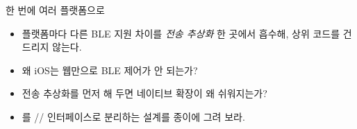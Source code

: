 \begin{teachbox}{한 번에 여러 플랫폼으로}
\begin{itemize}
  \item 플랫폼마다 다른 BLE 지원 차이를 \emph{전송 추상화} 한 곳에서 흡수해, 상위 코드를 건드리지 않는다.
\end{itemize}
\begin{itemize}
  \item 왜 iOS는 웹만으로 BLE 제어가 안 되는가?
  \item 전송 추상화를 먼저 해 두면 네이티브 확장이 왜 쉬워지는가?
\end{itemize}
\begin{itemize}
  \item {}를 // 인터페이스로 분리하는 설계를 종이에 그려 보라.
\end{itemize}
\end{teachbox}

